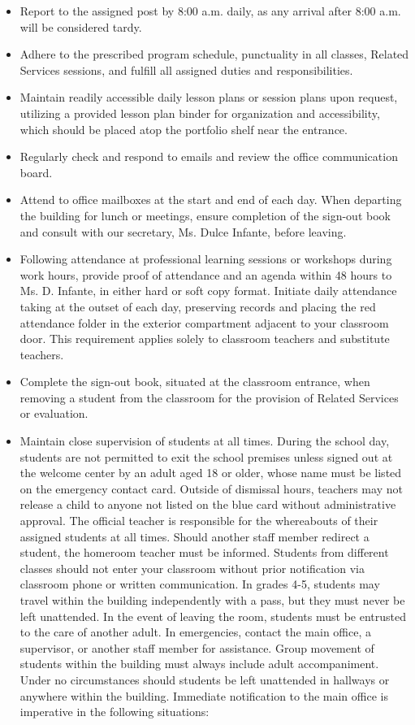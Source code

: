 \documentclass[11pt, letterpaper]{article}
\begin{document}
\begin{itemize}
\item Report to the assigned post by 8:00 a.m. daily, as any arrival after 8:00 a.m. will be considered tardy.
\item Adhere to the prescribed program schedule, punctuality in all classes, Related Services sessions, and fulfill all assigned duties and responsibilities.
\item Maintain readily accessible daily lesson plans or session plans upon request, utilizing a provided lesson plan binder for organization and accessibility, which should be placed atop the portfolio shelf near the entrance.
\item Regularly check and respond to emails and review the office communication board.
\item Attend to office mailboxes at the start and end of each day.
When departing the building for lunch or meetings, ensure completion of the sign-out book and consult with our secretary, Ms. Dulce Infante, before leaving.
\item Following attendance at professional learning sessions or workshops during work hours, provide proof of attendance and an agenda within 48 hours to Ms. D. Infante, in either hard or soft copy format.
Initiate daily attendance taking at the outset of each day, preserving records and placing the red attendance folder in the exterior compartment adjacent to your classroom door. This requirement applies solely to classroom teachers and substitute teachers.
\item Complete the sign-out book, situated at the classroom entrance, when removing a student from the classroom for the provision of Related Services or evaluation.
\item Maintain close supervision of students at all times. During the school day, students are not permitted to exit the school premises unless signed out at the welcome center by an adult aged 18 or older, whose name must be listed on the emergency contact card. Outside of dismissal hours, teachers may not release a child to anyone not listed on the blue card without administrative approval. The official teacher is responsible for the whereabouts of their assigned students at all times. Should another staff member redirect a student, the homeroom teacher must be informed. Students from different classes should not enter your classroom without prior notification via classroom phone or written communication. In grades 4-5, students may travel within the building independently with a pass, but they must never be left unattended. In the event of leaving the room, students must be entrusted to the care of another adult. In emergencies, contact the main office, a supervisor, or another staff member for assistance. Group movement of students within the building must always include adult accompaniment. Under no circumstances should students be left unattended in hallways or anywhere within the building. Immediate notification to the main office is imperative in the following situations: 

\end{itemize}
\end{document}
